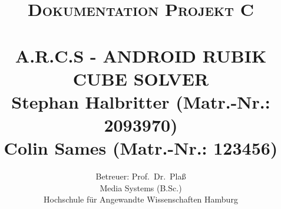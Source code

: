 

\title{\normalsize \textsc{Dokumentation Projekt C} 	%
		 	\\[2.0cm]													%
            \HRule{0.5pt} \\ [0.5cm]										%
			\LARGE \textbf{\uppercase{A.R.C.S - Android Rubik Cube Solver}}	%
			\HRule{0.5pt} \\ [0.5cm]								%
			\large Stephan Halbritter (Matr.-Nr.: 2093970)\\
      Colin Sames (Matr.-Nr.: 123456)\\
		}

\author{Betreuer: Prof.~Dr.~Plaß\\
    Media Systems (B.Sc.)\\
    Hochschule für Angewandte Wissenschaften Hamburg\\
}
